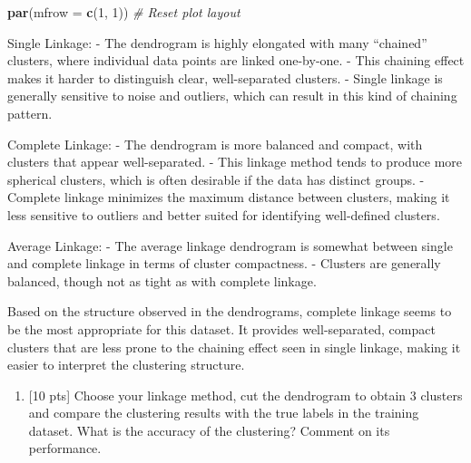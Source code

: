 \documentclass[
]{article}
\newenvironment{Shaded}{\begin{snugshade}}{\end{snugshade}}
\newcommand{\AttributeTok}[1]{\textcolor[rgb]{0.13,0.29,0.53}{#1}}
\newcommand{\CommentTok}[1]{\textcolor[rgb]{0.56,0.35,0.01}{\textit{#1}}}
\newcommand{\DecValTok}[1]{\textcolor[rgb]{0.00,0.00,0.81}{#1}}
\newcommand{\FunctionTok}[1]{\textcolor[rgb]{0.13,0.29,0.53}{\textbf{#1}}}
\newcommand{\NormalTok}[1]{#1}
\providecommand{\tightlist}{%
  \setlength{\itemsep}{0pt}\setlength{\parskip}{0pt}}
\begin{document}
\begin{Shaded}
\begin{Highlighting}[]
\FunctionTok{par}\NormalTok{(}\AttributeTok{mfrow =} \FunctionTok{c}\NormalTok{(}\DecValTok{1}\NormalTok{, }\DecValTok{1}\NormalTok{))  }\CommentTok{\# Reset plot layout}
\end{Highlighting}
\end{Shaded}

Single Linkage: - The dendrogram is highly elongated with many
``chained'' clusters, where individual data points are linked
one-by-one. - This chaining effect makes it harder to distinguish clear,
well-separated clusters. - Single linkage is generally sensitive to
noise and outliers, which can result in this kind of chaining pattern.

Complete Linkage: - The dendrogram is more balanced and compact, with
clusters that appear well-separated. - This linkage method tends to
produce more spherical clusters, which is often desirable if the data
has distinct groups. - Complete linkage minimizes the maximum distance
between clusters, making it less sensitive to outliers and better suited
for identifying well-defined clusters.

Average Linkage: - The average linkage dendrogram is somewhat between
single and complete linkage in terms of cluster compactness. - Clusters
are generally balanced, though not as tight as with complete linkage.

Based on the structure observed in the dendrograms, complete linkage
seems to be the most appropriate for this dataset. It provides
well-separated, compact clusters that are less prone to the chaining
effect seen in single linkage, making it easier to interpret the
clustering structure.

\bigskip

\begin{enumerate}
\def\labelenumi{\alph{enumi}.}
\setcounter{enumi}{1}
\tightlist
\item
  {[}10 pts{]} Choose your linkage method, cut the dendrogram to obtain
  3 clusters and compare the clustering results with the true labels in
  the training dataset. What is the accuracy of the clustering? Comment
  on its performance.
\end{enumerate}
\end{document}
